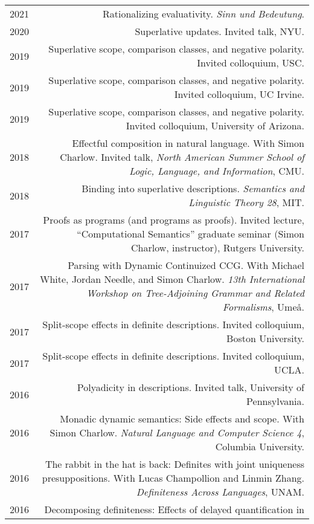\documentclass[12pt]{article}
\begin{document}
\begin{longtable}{LR}
  2021 & Rationalizing evaluativity.
         \textit{Sinn und Bedeutung}.\\
  2020 & Superlative updates.
         Invited talk, NYU.\\
  2019 & Superlative scope, comparison classes, and negative polarity.
         Invited colloquium, USC.\\
  2019 & Superlative scope, comparison classes, and negative polarity.
         Invited colloquium, UC Irvine.\\
  2019 & Superlative scope, comparison classes, and negative polarity.
         Invited colloquium, University of Arizona.\\
  2018 & Effectful composition in natural language.
         With Simon Charlow.
         Invited talk, \textit{North American Summer School of Logic, Language,
         and Information}, CMU.\\
  2018 & Binding into superlative descriptions.
         \textit{Semantics and Linguistic Theory 28}, MIT.\\
  2017 & Proofs as programs (and programs as proofs).
         Invited lecture, ``Computational Semantics''
         graduate seminar (Simon Charlow, instructor), Rutgers University.\\
  2017 & Parsing with Dynamic Continuized CCG.
         With Michael White, Jordan Needle, and Simon Charlow.
         \textit{13th International Workshop on Tree-Adjoining Grammar and
         Related Formalisms}, Ume\aa.\\
  2017 & Split-scope effects in definite descriptions.
         Invited colloquium, Boston University.\\
  2017 & Split-scope effects in definite descriptions.
         Invited colloquium, UCLA.\\
  2016 & Polyadicity in descriptions.
         Invited talk, University of Pennsylvania.\\
  2016 & Monadic dynamic semantics: Side effects and scope.
         With Simon Charlow.
         \textit{Natural Language and Computer Science 4}, Columbia University.\\
  2016 & The rabbit in the hat is back: Definites with joint uniqueness
         presuppositions.
         With Lucas Champollion and Linmin Zhang.
         \textit{Definiteness Across Languages}, UNAM.\\
  2016 & Decomposing definiteness: Effects of delayed quantification in

\end{longtable}
\end{document}
